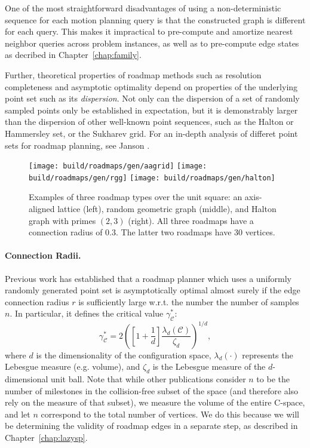 One of the most straightforward disadvantages of using a
non-deterministic sequence for each motion planning query
is that the constructed graph is different for each query.
This makes it impractical to pre-compute and amortize nearest
neighbor queries across problem instances,
as well as to pre-compute edge states as decribed in
Chapter~\ref{chap:family}.

Further,
theoretical properties of roadmap methods
such as resolution completeness and asymptotic optimality
depend on properties of the underlying point set
such as its \emph{dispersion}.
Not only can the dispersion of a set of randomly sampled points
only be established in expectation,
but it is demonstrably larger than the dispersion of other
well-known point sequences,
such as the Halton or Hammersley set,
or the Sukharev grid.
For an in-depth analysis of differet point sets for roadmap
planning, see Janson \citep{janson2015deterministicsampling}.

\begin{figure}
   \centering
   \texttt{[image: build/roadmaps/gen/aagrid]}
   \;
   \texttt{[image: build/roadmaps/gen/rgg]}
   \;
   \texttt{[image: build/roadmaps/gen/halton]}
   \caption{Examples of three roadmap types over the unit square:
      an axis-aligned lattice (left),
      random geometric graph (middle),
      and Halton graph with primes $(2,3)$ (right).
      All three roadmaps have a connection radius of 0.3.
      The latter two roadmaps have 30 vertices.}
\end{figure}

\paragraph{Connection Radii.}
Previous work \citep{karaman2011samplingoptimal} has established
that a roadmap planner which uses a uniformly randomly generated
point set is asymptotically optimal almost surely
if the edge connection radius $r$ is sufficiently large w.r.t.
the number the number of samples $n$.
In particular,
it defines the critical value $\gamma^*_{\mathcal{C}}$:
\begin{equation}
   \gamma^*_{\mathcal{C}}
      = 2 \left( \left[ 1 + \frac{1}{d} \right]
         \frac{\lambda_d(\mathcal{C})}{\zeta_d} \right)^{1/d},
\end{equation}
where $d$ is the dimensionality of the configuration space,
$\lambda_d(\cdot)$ represents the Lebesgue measure (e.g. volume),
and $\zeta_d$ is the Lebesgue measure of the $d$-dimensional unit ball.
Note that while other publications consider $n$ to be the number
of milestones in the collision-free subset of the space
(and therefore also rely on the measure of that subset),
we measure the volume of the entire C-space,
and let $n$ correspond to the total number of vertices.
We do this because we will be determining the validity of roadmap edges
in a separate step,
as described in Chapter~\ref{chap:lazysp}.

